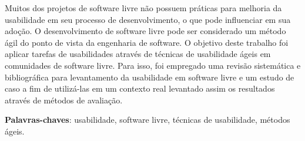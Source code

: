 \begin{resumo}

Muitos dos projetos de software livre não possuem práticas para melhoria da usabilidade em seu processo de desenvolvimento, o que pode influenciar em sua adoção.
%
O desenvolvimento de software livre pode ser considerado um método ágil do ponto de vista da engenharia de software.
%
O objetivo deste trabalho foi aplicar tarefas de usabilidades através de técnicas de usabilidade ágeis em comunidades de software livre.
%
Para isso, foi empregado uma revisão sistemática e bibliográfica para levantamento da usabilidade em software livre e um estudo de caso a fim de utilizá-las em um contexto real levantado assim os resultados através de métodos de avaliação.

 \vspace{\onelineskip}
    
 \noindent
 \textbf{Palavras-chaves}: usabilidade, software livre, técnicas de usabilidade, métodos ágeis.
\end{resumo}
